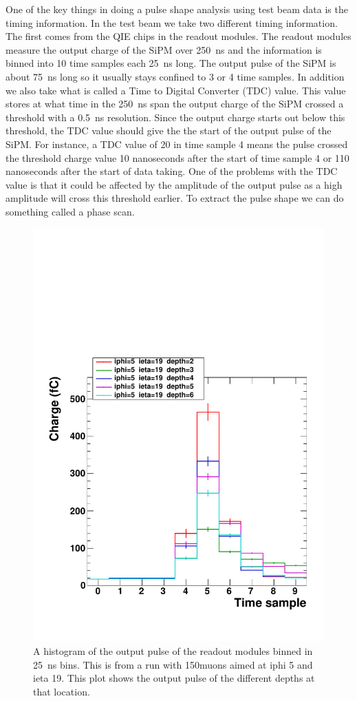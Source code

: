 One of the key things in doing a pulse shape analysis using test beam data is the timing information. In the test beam we take two different timing information. The first comes from the QIE chips in the readout modules. The readout modules measure the output charge of the SiPM over 250~ns and the information is binned into 10 time samples each 25~ns long. The output pulse of the SiPM is about 75~ns long so it usually stays confined to 3 or 4 time samples. In addition we also take what is called a Time to Digital Converter (TDC) value. This value stores at what time in the 250~ns span the output charge of the SiPM crossed a threshold with a 0.5~ns resolution. Since the output charge starts out below this threshold, the TDC value should give the the start of the output pulse of the SiPM. For instance, a TDC value of 20 in time sample 4 means the pulse crossed the threshold charge value 10 nanoseconds after the start of time sample 4 or 110 nanoseconds after the start of data taking. One of the problems with the TDC value is that it could be affected by the amplitude of the output pulse as a high amplitude will cross this threshold earlier. To extract the pulse shape we can do something called a phase scan. 

\begin{figure}
\centering
\includegraphics[width=0.7\linewidth]{Figures/Pulse.pdf}
\caption{A histogram of the output pulse of the readout modules binned in 25~ns bins. This is from a run with 150\GeV muons aimed at iphi 5 and ieta 19. This plot shows the output pulse of the different depths at that location.}
\label{fig:PulSh}
\end{figure}

